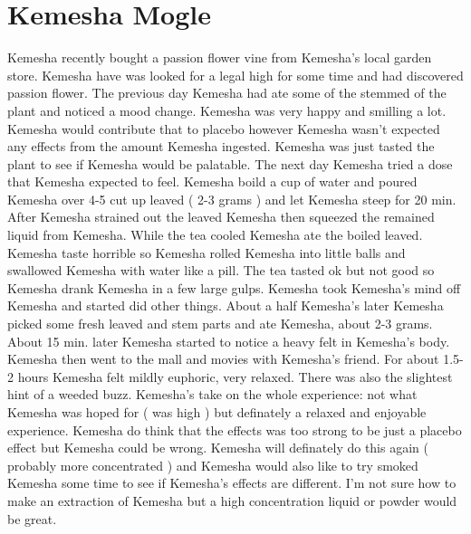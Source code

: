 \documentclass[12pt]{book}
\begin{document}
\chapter{Kemesha Mogle}

Kemesha recently bought a passion flower vine from Kemesha's local garden store. Kemesha have was looked for a legal high for some time and had discovered passion flower. The previous day Kemesha had ate some of the stemmed of the plant and noticed a mood change. Kemesha was very happy and smilling a lot. Kemesha would contribute that to placebo however Kemesha wasn't expected any effects from the amount Kemesha ingested. Kemesha was just tasted the plant to see if Kemesha would be palatable. The next day Kemesha tried a dose that Kemesha expected to feel. Kemesha boild a cup of water and poured Kemesha over 4-5 cut up leaved ( 2-3 grams ) and let Kemesha steep for 20 min. After Kemesha strained out the leaved Kemesha then squeezed the remained liquid from Kemesha. While the tea cooled Kemesha ate the boiled leaved. Kemesha taste horrible so Kemesha rolled Kemesha into little balls and swallowed Kemesha with water like a pill. The tea tasted ok but not good so Kemesha drank Kemesha in a few large gulps. Kemesha took Kemesha's mind off Kemesha and started did other things. About a half Kemesha's later Kemesha picked some fresh leaved and stem parts and ate Kemesha, about 2-3 grams. About 15 min. later Kemesha started to notice a heavy felt in Kemesha's body. Kemesha then went to the mall and movies with Kemesha's friend. For about 1.5-2 hours Kemesha felt mildly euphoric, very relaxed. There was also the slightest hint of a weeded buzz. Kemesha's take on the whole experience: not what Kemesha was hoped for ( was high ) but definately a relaxed and enjoyable experience. Kemesha do think that the effects was too strong to be just a placebo effect but Kemesha could be wrong. Kemesha will definately do this again ( probably more concentrated ) and Kemesha would also like to try smoked Kemesha some time to see if Kemesha's effects are different. I'm not sure how to make an extraction of Kemesha but a high concentration liquid or powder would be great.
\end{document}
